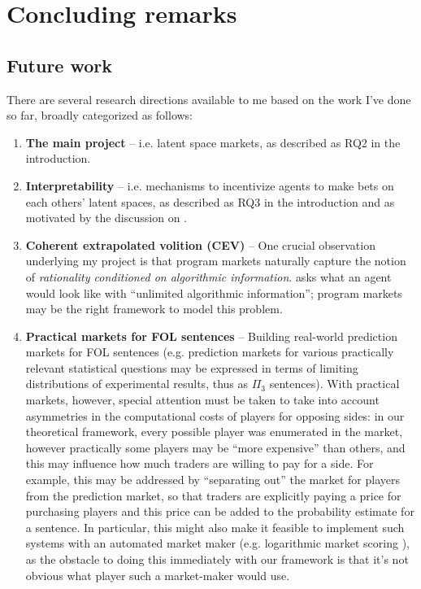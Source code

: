 \documentclass{article}
\begin{document}
\section{Concluding remarks}

\subsection{Future work}

There are several research directions available to me based on the work I've done so far, broadly categorized as follows:

\begin{enumerate}
    \item \textbf{The main project} -- i.e. latent space markets, as described as RQ2 in the introduction.
    \item \textbf{Interpretability} -- i.e. mechanisms to incentivize agents to make bets on each others' latent spaces, as described as RQ3 in the introduction and as motivated by the discussion on \cite{christianoElicitingLatentKnowledge2021}.
    \item \textbf{Coherent extrapolated volition (CEV)} -- One crucial observation underlying my project is that program markets naturally capture the notion of \emph{rationality conditioned on algorithmic information}. \cite{yudkowskyCoherentExtrapolatedVolition2004} asks what an agent would look like with ``unlimited algorithmic information''; program markets may be the right framework to model this problem. 
    \item \textbf{Practical markets for FOL sentences} -- Building real-world prediction markets for FOL sentences (e.g. prediction markets for various practically relevant statistical questions may be expressed in terms of limiting distributions of experimental results, thus as $\Pi_3$ sentences). With practical markets, however, special attention must be taken to take into account asymmetries in the computational costs of players for opposing sides: in our theoretical framework, every possible player was enumerated in the market, however practically some players may be ``more expensive'' than others, and this may influence how much traders are willing to pay for a side. For example, this may be addressed by ``separating out'' the market for players from the prediction market, so that traders are explicitly paying a price for purchasing players and this price can be added to the probability estimate for a sentence. In particular, this might also make it feasible to implement such systems with an automated market maker (e.g. logarithmic market scoring \cite{hansonLogarithmicMarketScoring2002, hansonCombinatorialInformationMarket2003}), as the obstacle to doing this immediately with our framework is that it's not obvious what player such a market-maker would use. 

\end{enumerate}
\end{document}
